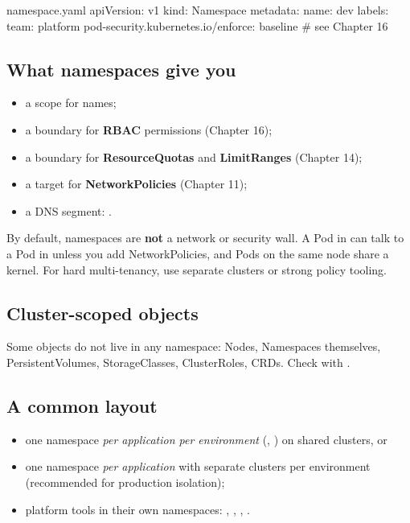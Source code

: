 \begin{yamlcode}{namespace.yaml}
apiVersion: v1
kind: Namespace
metadata:
  name: dev
  labels:
    team: platform
    pod-security.kubernetes.io/enforce: baseline   # see Chapter 16
\end{yamlcode}

\subsection{What namespaces give you}

\begin{itemize}
  \item a scope for names;
  \item a boundary for \textbf{RBAC} permissions (Chapter 16);
  \item a boundary for \textbf{ResourceQuotas} and \textbf{LimitRanges} (Chapter 14);
  \item a target for \textbf{NetworkPolicies} (Chapter 11);
  \item a DNS segment: .
\end{itemize}

\begin{warningbox}
By default, namespaces are \textbf{not} a network or security wall. A Pod in
 can talk to a Pod in  unless you add NetworkPolicies, and
Pods on the same node share a kernel. For hard multi-tenancy, use separate
clusters or strong policy tooling.
\end{warningbox}

\subsection{Cluster-scoped objects}

Some objects do not live in any namespace: Nodes, Namespaces themselves,
PersistentVolumes, StorageClasses, ClusterRoles, CRDs. Check with
.

\subsection{A common layout}

\begin{itemize}
  \item one namespace \emph{per application per environment} (,
        ) on shared clusters, or
  \item one namespace \emph{per application} with separate clusters per
        environment (recommended for production isolation);
  \item platform tools in their own namespaces: ,
        , , .
\end{itemize}

